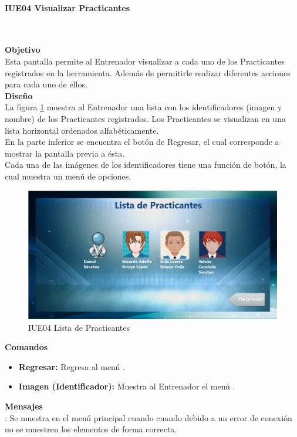 \paragraph{IUE04 Visualizar Practicantes} \hspace{1cm}\\
\label{pant:IUE04}

\textbf{\textcolor[rgb]{0, 0, 0.545098}{Objetivo}}\\
Esta pantalla permite al Entrenador visualizar a cada uno de los Practicantes registrados en la herramienta. Además de permitirle realizar diferentes acciones para cada uno de ellos.\\

\textbf{\textcolor[rgb]{0, 0, 0.545098}{Diseño}}\\
La figura \ref{fig:IUE04} muestra al Entrenador una lista con los identificadores (imagen y nombre) de los Practicantes registrados. Los Practicantes se visualizan en una lista horizontal ordenados alfabéticamente.\\

En la parte inferior se encuentra el botón de Regresar, el cual corresponde a mostrar la pantalla previa a ésta.\\

Cada una de las imágenes de los identificadores tiene una función de botón, la cual muestra un menú de opciones.\\

\begin{figure}[H]
	\centering
		\includegraphics[scale=0.5]{./Figuras/Pantallas/IUE04Visualizar_Practicantes}
	\caption{IUE04 Lista de Practicantes}
	\label{fig:IUE04}
\end{figure}

\textbf{\textcolor[rgb]{0, 0, 0.545098}{Comandos}}
\begin{itemize}
	\item \textbf{\textcolor[rgb]{0, 0, 0.545098}{Regresar:}} Regresa al menú .
	\item \textbf{\textcolor[rgb]{0, 0, 0.545098}{Imagen (Identificador):}} Muestra al Entrenador el menú .	
\end{itemize}
\vspace{1em}

\textbf{\textcolor[rgb]{0, 0, 0.545098}{Mensajes}}\\

: Se muestra en el menú principal  cuando cuando debido a un error de conexión no se muestren los elementos de forma correcta.\\

\clearpage